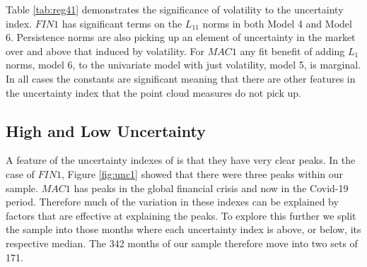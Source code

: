 \documentclass{article}
\begin{document}
Table \ref{tab:reg41} demonstrates the significance of volatility to the uncertainty index. $FIN1$ has significant terms on the $L_{11}$ norms in both Model 4 and Model 6. Persistence norms are also picking up an element of uncertainty in the market over and above that induced by volatility. For $MAC1$ any fit benefit of adding $L_1$ norms, model 6, to the univariate model with just volatility, model 5, is marginal. In all cases the constants are significant meaning that there are other features in the uncertainty index that the point cloud measures do not pick up.

\subsection{High and Low Uncertainty}

A feature of the uncertainty indexes of \cite{jurado2015measuring} is that they have very clear peaks. In the case of $FIN1$, Figure \ref{fig:unc1} showed that there were three peaks within our sample. $MAC1$ has peaks in the global financial crisis and now in the Covid-19 period. Therefore much of the variation in these indexes can be explained by factors that are effective at explaining the peaks. To explore this further we split the sample into those months where each uncertainty index is above, or below, its respective median. The 342 months of our sample therefore move into two sets of 171. 
\end{document}
